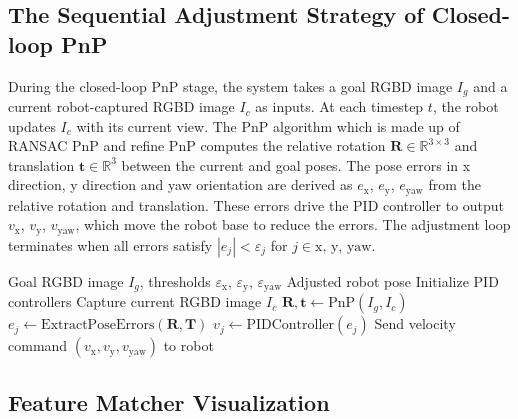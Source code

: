 \subsection{The Sequential Adjustment Strategy of Closed-loop PnP}

During the closed-loop PnP stage, the system takes a goal RGBD image $I_g$ and a current robot-captured RGBD image $I_c$ as inputs. At each timestep $t$, the robot updates $I_c$ with its current view. The $\text{PnP}$ algorithm which is made up of RANSAC PnP \cite{zuliani2009ransac} and refine PnP \cite{madsen2004methods,eade2013gauss,bradski2000opencv} computes the relative rotation $\mathbf{R} \in \mathbb{R}^{3\times 3}$ and translation $\mathbf{t} \in \mathbb{R}^3$ between the current and goal poses. The pose errors in x direction, y direction and yaw orientation are derived as $e_{\text{x}}$, $e_{\text{y}}$, $e_{\text{yaw}}$ from the relative rotation and translation. These errors drive the PID controller \cite{willis1999proportional} to output $v_{\text{x}}$, $v_{\text{y}}$, $v_{\text{yaw}}$, which move the robot base to reduce the errors. The adjustment loop terminates when all errors satisfy $|e_j| < \varepsilon_j$ for $j \in {\text{x, y, yaw}}$.

\begin{algorithm}
\caption{Closed-loop PnP Adjustment}\label{alg:PnP}
\begin{algorithmic}
\Require Goal RGBD image $I_g$, thresholds $\varepsilon_{\text{x}}$, $\varepsilon_{\text{y}}$, $\varepsilon_{\text{yaw}}$
\Ensure Adjusted robot pose
\State Initialize PID controllers
    \State Capture current RGBD image $I_c$
    \State $\mathbf{R}, \mathbf{t} \gets \text{PnP}(I_g, I_c)$ 
        \State $e_j  \gets\text{ExtractPoseErrors}(\mathbf{R,T})$
        \State $v_j \gets \text{PIDController}(e_j)$
    \EndFor
    \State Send velocity command $(v_{\text{x}}, v_{\text{y}}, v_{\text{yaw}})$ to robot
\EndWhile
\end{algorithmic}
\end{algorithm}





\subsection{Feature Matcher Visualization}

